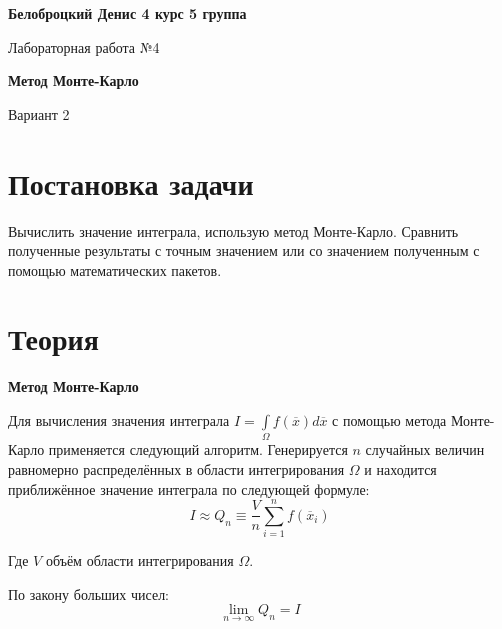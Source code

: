 \documentclass[12pt]{article}
\begin{document}
\textbf{Белоброцкий Денис 4 курс 5 группа}
\\
\begin{center}
	{\Large Лабораторная работа №4}
\end{center} 
\begin{center}
	{\large \textbf{Метод Монте-Карло}}
\end{center} 
\begin{center}
	Вариант 2
\end{center}

	\section*{Постановка задачи}
	\par Вычислить значение интеграла, использую метод Монте-Карло. Сравнить полученные результаты с точным значением или со значением полученным с помощью математических пакетов.
	\section*{Теория}
	\par \textbf{Метод Монте-Карло} 
	\par Для вычисления значения интеграла $ I = \int\limits_{\Omega} f(\overline{x}) d\overline{x} $ с помощью метода Монте-Карло применяется следующий алгоритм. Генерируется $ n $ случайных величин равномерно распределённых в области интегрирования $ \Omega $ и находится приближённое значение интеграла по следующей формуле:
	$$ I \approx Q_n \equiv \frac{V}{n} \sum\limits_{i=1}^n f(\overline{x}_i) $$
	\par Где $ V $ объём области интегрирования $ \Omega $.
	\par По закону больших чисел:
	$$ \lim\limits_{n\to \infty} Q_n = I $$
\end{document}
